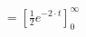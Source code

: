 \documentclass[preview]{standalone}
\begin{document}
\begin{align*}
= [\frac{1}{2}e^{-2\cdot t}]^{\infty}_{0}
\end{align*}
\end{document}
